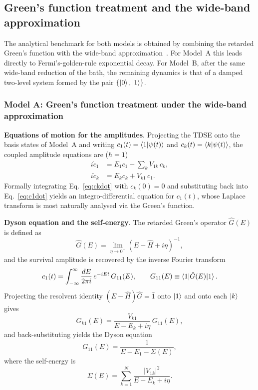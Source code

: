 \documentclass[aps,prx,reprint,showpacs,showkeys,floatfix]{revtex4-2}
\begin{document}
\subsection{Green's function treatment and the wide-band approximation}
\label{sec:GF}

The analytical benchmark for both models is obtained by combining the
retarded Green's function with the wide-band approximation~\cite{Nitzan,Weiss}.  For Model~A
this leads directly to Fermi's-golden-rule exponential decay.  For
Model~B, after the same wide-band reduction of the bath, the remaining
dynamics is that of a damped two-level system formed by the pair
$\{\ket{0},\ket{1}\}$.

\subsubsection{Model A: Green's function treatment under the wide-band approximation}

{\bf Equations of motion for the amplitudes}. Projecting the TDSE onto the basis states of Model~A and writing
$c_1(t)=\braket{1|\psi(t)}$ and $c_k(t)=\braket{k|\psi(t)}$, the
coupled amplitude equations are ($\hbar=1$)
\begin{align}
    i\dot{c}_1 &= E_1 c_1 + \sum_k V_{1k}\,c_k, \label{eq:c1dot}\\
    i\dot{c}_k &= E_k c_k + V_{k1}\,c_1. \label{eq:ckdot}
\end{align}
Formally integrating Eq.~\eqref{eq:ckdot} with $c_k(0)=0$ and substituting
back into Eq.~\eqref{eq:c1dot} yields an integro-differential equation for
$c_1(t)$, whose Laplace transform is most naturally analysed via the Green's
function.

{\bf Dyson equation and the self-energy}. The retarded Green's operator $\hat{G}(E)$ is defined as
\begin{equation}
    \hat{G}(E) = \lim_{\eta\to 0^+}(E - \hat{H} + i\eta)^{-1},
    \label{eq:Gret}
\end{equation}
and the survival amplitude is recovered by the inverse Fourier transform
\begin{equation}
    c_1(t) = \int_{-\infty}^{\infty}\frac{dE}{2\pi i}\,
             e^{-iEt}\,G_{11}(E), \qquad
    G_{11}(E) \equiv \braket{1|\hat{G}(E)|1}.
    \label{eq:c1_GF}
\end{equation}
Projecting the resolvent identity $(E-\hat{H})\hat{G}=\hat{1}$ onto
$\ket{1}$ and onto each $\ket{k}$ gives
\begin{equation}
    G_{k1}(E) = \frac{V_{k1}}{E - E_k + i\eta}\,G_{11}(E),
\end{equation}
and back-substituting yields the Dyson equation
\begin{equation}
    G_{11}(E) = \frac{1}{E - E_1 - \Sigma(E)},
    \label{eq:Dyson}
\end{equation}
where the self-energy is
\begin{equation}
    \Sigma(E) = \sum_{k=1}^{N}\frac{|V_{1k}|^2}{E - E_k + i\eta}.
    \label{eq:SelfEnergy}
\end{equation}
\end{document}
